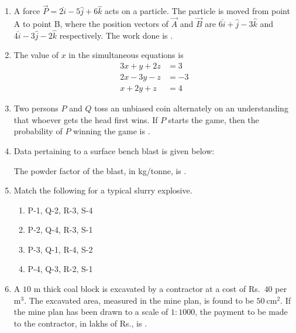 \documentclass[journal]{IEEEtran}
\begin{document}
\begin{enumerate}
\item A force $\vec{P} = 2\hat{i} - 5\hat{j} + 6\hat{k}$ acts on a particle. The particle is moved from point A to point B, where the position vectors of $\vec{A}$ and $\vec{B}$ are $6\hat{i} + \hat{j} - 3\hat{k}$ and $4\hat{i} - 3\hat{j} - 2\hat{k}$ respectively. The work done is \underline{\hspace{2cm}}.

\hfill{}

\item The value of $x$ in the simultaneous equations is \underline{\hspace{2cm}}
\[
\begin{aligned}
3x + y + 2z &= 3 \\
2x - 3y - z &= -3 \\
x + 2y + z &= 4
\end{aligned}
\]

\hfill{}

\item Two persons $P$ and $Q$ toss an unbiased coin alternately on an understanding that whoever gets the head first wins. If $P$ starts the game, then the probability of $P$ winning the game is \underline{\hspace{2cm}}.
\hfill{}
\item Data pertaining to a surface bench blast is given below:  


\vspace{0.5em}
The powder factor of the blast, in kg/tonne, is \underline{\hspace{2cm}}.
\hfill{}
\item Match the following for a typical slurry explosive.  

\begin{center}


\end{center}

\begin{enumerate}
\item P-1, Q-2, R-3, S-4
    \item P-2, Q-4, R-3, S-1
    \item P-3, Q-1, R-4, S-2
    \item P-4, Q-3, R-2, S-1
\end{enumerate}
\hfill{}

\item A $10$ m thick coal block is excavated by a contractor at a cost of Rs.\ $40$ per m$^3$. 
The excavated area, measured in the mine plan, is found to be $50\ \mathrm{cm}^2$. 
If the mine plan has been drawn to a scale of $1\!:\!1000$, the payment to be made to the contractor, 
in lakhs of Rs., is \underline{\hspace{2cm}}.
\hfill{}


\end{enumerate}
\end{document}
